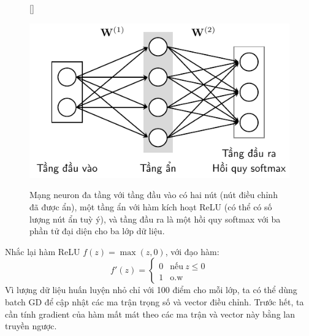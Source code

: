 \begin{figure}[t]
[\FBwidth]
{\caption{
Mạng neuron đa tầng với tầng đầu vào có hai nút (nút điều chỉnh đã được ẩn),
một tầng ẩn với hàm kích hoạt ReLU (có thể có số lượng nút ẩn
tuỳ ý), và tầng đầu ra là một hồi quy softmax với ba phần tử đại diện
cho ba lớp dữ liệu.
}
\label{fig:14_8}}
{ %
\includegraphics[width=.5\textwidth]{Chapters/05_NeuralNetworks/14_mlp/latex/ex_nn.pdf}
}
\end{figure}
Nhắc lại hàm ReLU $f(z) = \max(z, 0)$, với đạo hàm:
\begin{equation}
f'(z) = \left\{
\begin{matrix}
0 & \text{nếu}~ z \leq 0 \\
1 & \text{o.w}
\end{matrix}
\right.
\end{equation}
Vì lượng dữ liệu huấn luyện nhỏ chỉ với 100 điểm cho mỗi lớp, ta có thể dùng
batch GD để cập nhật các ma trận trọng số và vector điều chỉnh. Trước hết, ta cần tính
gradient của hàm mất mát theo các ma trận và vector này bằng lan truyền ngược.


